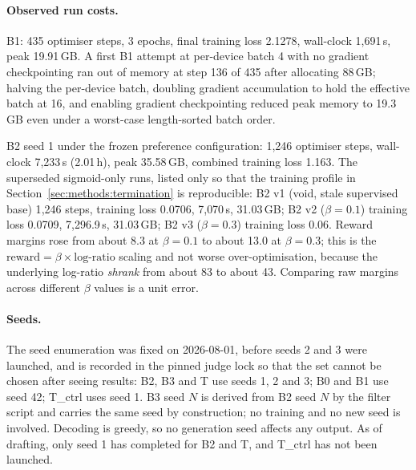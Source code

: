 \paragraph{Observed run costs.} B1: 435 optimiser steps, 3 epochs, final training loss
2.1278, wall-clock 1{,}691\,s, peak 19.91\,GB. A first B1 attempt at per-device batch 4
with no gradient checkpointing ran out of memory at step 136 of 435 after allocating
88\,GB; halving the per-device batch, doubling gradient accumulation to hold the effective
batch at 16, and enabling gradient checkpointing reduced peak memory to 19.3\,GB even
under a worst-case length-sorted batch order.

B2 seed 1 under the frozen preference configuration: 1{,}246 optimiser steps, wall-clock
7{,}233\,s (2.01\,h), peak 35.58\,GB, combined training loss 1.163. The superseded
sigmoid-only runs, listed only so that the training profile in
Section~\ref{sec:methods:termination} is reproducible: B2 v1 (void, stale supervised base)
1{,}246 steps, training loss 0.0706, 7{,}070\,s, 31.03\,GB; B2 v2 ($\beta=0.1$) training
loss 0.0709, 7{,}296.9\,s, 31.03\,GB; B2 v3 ($\beta=0.3$) training loss 0.06. Reward
margins rose from about 8.3 at $\beta=0.1$ to about 13.0 at $\beta=0.3$; this is the
$\text{reward} = \beta \times \text{log-ratio}$ scaling and not worse over-optimisation,
because the underlying log-ratio \emph{shrank} from about 83 to about 43. Comparing raw
margins across different $\beta$ values is a unit error.

\paragraph{Seeds.} The seed enumeration was fixed on 2026-08-01, before seeds 2 and 3 were
launched, and is recorded in the pinned judge lock so that the set cannot be chosen after
seeing results: B2, B3 and T use seeds 1, 2 and 3; B0 and B1 use seed 42; T\_ctrl uses seed
1. B3 seed $N$ is derived from B2 seed $N$ by the filter script and carries the same seed by
construction; no training and no new seed is involved. Decoding is greedy, so no generation
seed affects any output. As of drafting, only seed 1 has completed for B2 and T, and
T\_ctrl has not been launched.

